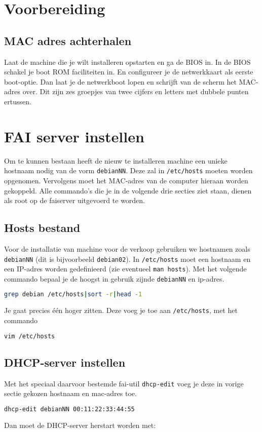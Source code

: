 \section{Voorbereiding}
\subsection{MAC adres achterhalen}
Laat de machine die je wilt installeren opstarten en ga de BIOS in. In de BIOS schakel je boot ROM faciliteiten in. En configureer je de netwerkkaart als eerste boot-optie. Dan laat je de netwerkboot lopen en schrijft van de scherm het MAC-adres over. Dit zijn zes groepjes van twee cijfers en letters met dubbele punten ertussen. 

\section{FAI server instellen}
Om te kunnen bestaan heeft de nieuw te installeren machine een unieke hostnaam nodig van de vorm \texttt{debianNN}. Deze zal in \texttt{/etc/hosts} moeten worden opgenomen. Vervolgens moet het MAC-adres van de computer hieraan worden gekoppeld. Alle commando's die je in de volgende drie secties ziet staan, dienen als root op de faiserver uitgevoerd te worden.
\subsection{Hosts bestand}
Voor de installatie van machine voor de verkoop gebruiken we hostnamen zoals \texttt{debianNN} (dit is bijvoorbeeld \texttt{debian02}).
In \texttt{/etc/hosts} moet een hostnaam en een IP-adres worden gedefinieerd (zie eventueel \texttt{man hosts}). Met het volgende commando bepaal je de hoogst in gebruik zijnde \texttt{debianNN} en ip-adres.  
\begin{lstlisting}[language=bash]
grep debian /etc/hosts|sort -r|head -1
\end{lstlisting}
Je gaat precies \'{e}\'{e}n hoger zitten. Deze voeg je toe aan \texttt{/etc/hosts}, met het commando
\begin{lstlisting}[language=bash]
vim /etc/hosts
\end{lstlisting}
\subsection{DHCP-server instellen}
Met het speciaal daarvoor bestemde fai-util \texttt{dhcp-edit} voeg je deze in vorige sectie gekozen hostnaam en mac-adres toe.
\begin{lstlisting}[language=bash]
dhcp-edit debianNN 00:11:22:33:44:55
\end{lstlisting}
Dan moet de DHCP-server herstart worden met:

